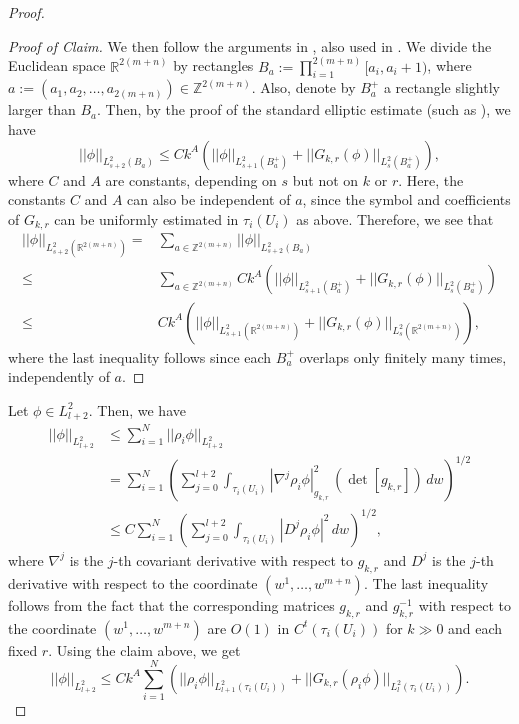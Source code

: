 \documentclass{amsart}
\numberwithin{equation}{section}
\theoremstyle{plain}
\theoremstyle{definition}
\theoremstyle{remark}
\begin{document}
\begin{proof}
\begin{proof}[Proof of Claim]
We then follow the arguments in \cite[Section 3.4]{Donaldson}, also used in \cite[Lemma 5.4]{Fine}. We divide the Euclidean space $\mathbb{R}^{2(m+n)}$ by rectangles $B_a:=\prod_{i=1}^{2(m+n)}[a_i,a_i+1)$, where $a:=(a_1,a_2,\dots,a_{2(m+n)})\in\mathbb{Z}^{2(m+n)}$. Also, denote by $B_a^+$ a rectangle slightly larger than $B_a$. Then, by the proof of the standard elliptic estimate (such as \cite[Chapter 5 Theorem 11.1]{Taylor}), we have 
$$ ||\phi||_{L^2_{s+2}(B_a)} \le C k^A \left( ||\phi||_{L^2_{s+1}(B_a^+)} + ||G_{k,r}(\phi)||_{L^2_s(B_a^+)} \right),$$
where $C$ and $A$ are constants, depending on $s$ but not on $k$ or $r$. Here, the constants $C$ and $A$ can also be independent of $a$, since the symbol and coefficients of $G_{k,r}$ can be uniformly estimated in $\tau_i(U_i)$ as above. Therefore, we see that
\begin{align*}
    ||\phi||_{L^2_{s+2}(\mathbb{R}^{2(m+n)})}
    =&\sum_{a\in \mathbb{Z}^{2(m+n)}}||\phi||_{L^2_{s+2}(B_a)}\\
    \le &\sum_{a\in \mathbb{Z}^{2(m+n)}}C k^A \left( ||\phi||_{L^2_{s+1}(B_a^+)} + ||G_{k,r}(\phi)||_{L^2_s(B_a^+)}\right)\\
    \le &C k^A \left( ||\phi||_{L^2_{s+1}(\mathbb{R}^{2(m+n)})} + ||G_{k,r}(\phi)||_{L^2_s(\mathbb{R}^{2(m+n)})} \right),
\end{align*} 
where the last inequality follows since each $B_a^+$ overlaps only finitely many times, independently of $a$.
\end{proof}
Let $\phi \in L^2_{l+2}$. Then, we have 
\begin{align*}
||\phi||_{L^2_{l+2}} &\le \sum^N_{i=1} ||\rho_i \phi||_{L^2_{l+2}}\\
                         &= \sum^N_{i=1} \left(\sum^{l+2}_{j=0} \int_{\tau_i(U_i)} |\nabla^j \rho_i \phi|^2_{g_{k,r}} \, \left(\det[g_{k,r}]\right) \, dw \right)^{1/2}\\
                         &\le C \sum^N_{i=1} \left(\sum^{l+2}_{j=0} \int_{\tau_i(U_i)} |D^j \rho_i \phi|^2 \, dw \right)^{1/2},
\end{align*}
where $\nabla^j$ is the $j$-th covariant derivative with respect to $g_{k,r}$ and $D^j$ is the $j$-th derivative with respect to the coordinate $(w^1, \dots, w^{m+n})$. The last inequality follows from the fact that the corresponding matrices $g_{k,r}$ and $g_{k,r}^{-1}$  with respect to the coordinate $(w^1, \dots, w^{m+n})$ are $O(1)$ in $C^t(\tau_i(U_i))$ for $k \gg 0$ and each fixed $r$. Using the claim above, we get 
$$||\phi||_{L^2_{l+2}} \le C k^{A} \sum^N_{i=1} \left(||\rho_i \phi||_{L^2_{l+1}(\tau_i(U_i))} + ||G_{k,r}(\rho_i \phi)||_{L^2_{l}(\tau_i(U_i))} \right).$$

\end{proof}
\end{document}

